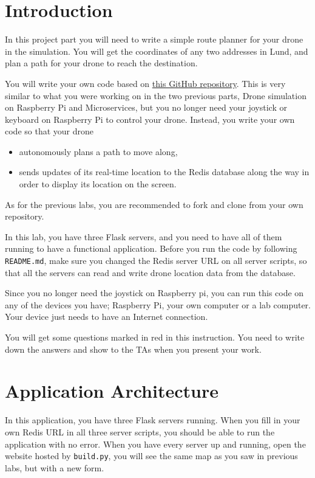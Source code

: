 \documentclass{article}
\begin{document}
\section{Introduction}
In this project part you will need to write a simple route planner for your drone in the simulation. You will get the coordinates of any two addresses in Lund, and plan a path for your drone to reach the destination. 

You will write your own code based on {\color{blue}\href{https://github.com/rogerhenriksson/InfoCom-Drone-3-Route_Planning}{this GitHub repository}}. This is very similar to what you were working on in the two previous parts, Drone simulation on Raspberry Pi and Microservices, but you no longer need your joystick or keyboard on Raspberry Pi to control your drone. Instead, you write your own code so that your drone
\begin{itemize}
    \item autonomously plans a path to move along,
    \item sends updates of its real-time location to the Redis database along the way in order to display its location on the screen.
\end{itemize}
As for the previous labs, you are recommended to fork and clone from your own repository.

In this lab, you have three Flask servers, and you need to have all of them running to have a functional application. Before you run the code by following \verb!README.md!, make sure you changed the Redis server URL on all server scripts, so that all the servers can read and write drone location data from the database.

Since you no longer need the joystick on Raspberry pi, you can run this code on any of the devices you have; Raspberry Pi, your own computer or a lab computer. Your device just needs to have an Internet connection.\vspace{0.3cm}

\parbox[t]{14cm}{{You will get some questions marked in red in this instruction. You need to write down the answers and show to the TAs when you present your work.}}\vspace{0.2cm}

\section{Application Architecture}

In this application, you have three Flask servers running. When you fill in your own Redis URL in all three server scripts, you should be able to run the application with no error. When you have every server up and running, open the website hosted by \verb!build.py!, you will see the same map as you saw in previous labs, but with a new form.
\end{document}
